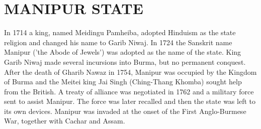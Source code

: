 \documentclass[10pt,a4 paper,two column]{article}
\begin{document}
\section {MANIPUR STATE}
In 1714 a king, named Meidingu Pamheiba, adopted Hinduism as the state religion and changed his name to Garib Niwaj. In 1724 the Sanskrit name Manipur ('the Abode of Jewels') was adopted as the name of the state. King Garib Niwaj made several incursions into Burma, but no permanent conquest. After the death of Gharib Nawaz in 1754, Manipur was occupied by the Kingdom of Burma and the Meitei king Jai Singh (Ching-Thang Khomba) sought help from the British. A treaty of alliance was negotiated in 1762 and a military force sent to assist Manipur. The force was later recalled and then the state was left to its own devices. Manipur was invaded at the onset of the First Anglo-Burmese War, together with Cachar and Assam.
\end{document}
